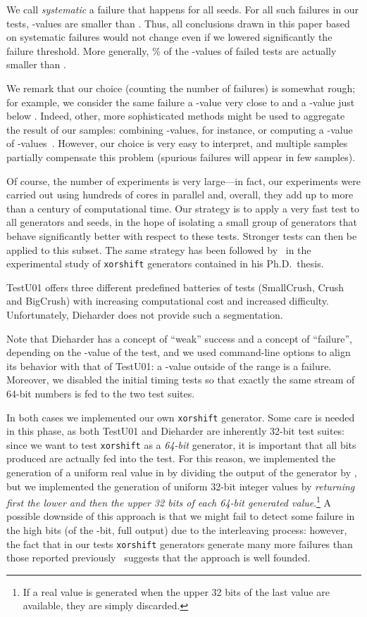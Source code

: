 \documentclass{acmsmalltr}
\newcommand{\xorshift}[1][]{\texttt{xorshift#1}\xspace}
\begin{document}
We call \emph{systematic} a failure that happens for all seeds. For all such
failures in our tests, -values are smaller than . Thus, all
conclusions drawn in this paper based on systematic failures would not change
even if we lowered significantly the failure threshold. More generally, \%
of the -values of failed tests are actually smaller than .

We remark that our choice (counting the number of failures) is somewhat rough;
for example, we consider the same failure a -value very close to  and a
-value just below . Indeed, other, more sophisticated methods might be
used to aggregate the result of our samples: combining -values, for instance,
or computing a -value of -values~\cite{RSNSTSRPNGCA}.
However, our choice is very easy to interpret, and multiple samples partially
compensate this problem (spurious failures will appear in few samples).

Of course, the number of experiments is very large---in fact, our experiments
were carried out using hundreds of cores in parallel and, overall, they add up
to more than a century of computational time. Our strategy is to apply a very fast
test to all generators and seeds, in the hope of isolating a small group of
generators that behave significantly better with respect to these tests.
Stronger tests can then be applied to this subset. The same strategy has been followed by~ in the experimental study
of \xorshift generators contained in his Ph.D.~thesis.

TestU01 offers three different predefined batteries of tests (SmallCrush, Crush
and BigCrush) with increasing computational cost and increased difficulty.
Unfortunately, Dieharder does not provide such a segmentation.

Note that Dieharder has a concept of ``weak'' success and a concept of ``failure'',
depending on the -value of the test, and we used command-line options to align
its behavior with that of TestU01: a -value outside of the range
 is a failure. Moreover, we disabled the initial timing tests so
that exactly the same stream of 64-bit numbers is fed to the two test suites.

In both cases we implemented our own \xorshift generator. Some care is needed in
this phase, as both TestU01 and Dieharder are inherently 32-bit test suites:
since we want to test \xorshift as a \emph{64-bit} generator, it is important
that all bits produced are actually fed into the test. For this reason, we
implemented the generation of a uniform real value in  by dividing the
output of the generator by , but we implemented the generation of
uniform 32-bit integer values by \emph{returning first the lower and then the upper
32 bits of each 64-bit generated value}.\footnote{If a real value is generated
when the upper 32 bits of the last value are available, they are simply
discarded.} A possible downside of this approach is 
that we might fail to detect some failure in the high bits (of the -bit,
full output) due to the interleaving process: however, the fact that in our
tests \xorshift generators generate many more failures than those reported previously~\cite{PaLXRNG}
suggests that the approach is well founded.
\end{document}
